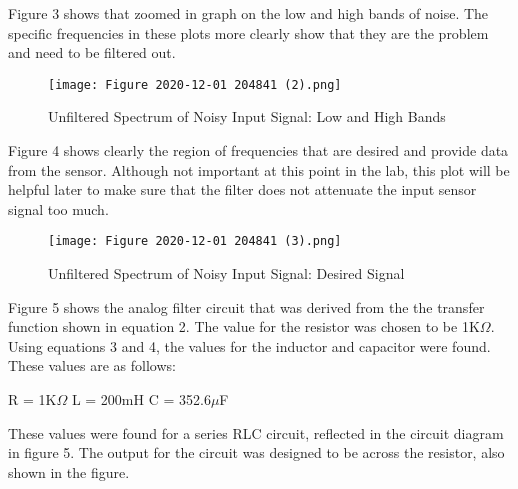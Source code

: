 \documentclass[12pt, titlepage]{article}
\begin{document}
    \clearpage
    Figure 3 shows that zoomed in graph on the low and high bands of noise.  The specific frequencies in these plots more clearly show that they are the problem and need to be filtered out.
        \begin{figure}[h!]
            \centering
            \texttt{[image: Figure 2020-12-01 204841 (2).png]}
            \caption{Unfiltered Spectrum of Noisy Input Signal: Low and High Bands}
            \label{fig:my_label}
        \end{figure}
        
    \clearpage   
    Figure 4 shows clearly the region of frequencies that are desired and provide data from the sensor.  Although not important at this point in the lab, this plot will be helpful later to make sure that the filter does not attenuate the input sensor signal too much.
        \begin{figure}[h!]
            \centering
            \texttt{[image: Figure 2020-12-01 204841 (3).png]}
            \caption{Unfiltered Spectrum of Noisy Input Signal: Desired Signal}
            \label{fig:my_label}
        \end{figure}
        
    \clearpage
    Figure 5 shows the analog filter circuit that was derived from the the transfer function shown in equation 2.  The value for the resistor was chosen to be 1K$\Omega$.  Using equations 3 and 4, the values for the inductor and capacitor were found.  These values are as follows:
    
        R = 1K$\Omega$\newline
        L = 200mH\newline
        C = 352.6$\mu$F
    
    These values were found for a series RLC circuit, reflected in the circuit diagram in figure 5.  The output for the circuit was designed to be across the resistor, also shown in the figure.
        
\end{document}
